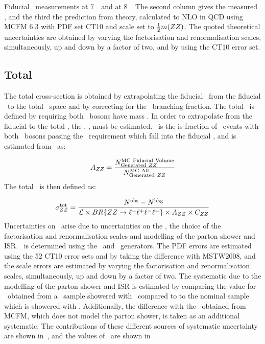 \begin{table}
      \caption[Fiducial \CX\ measurements at 7~\tev\ and at 8~\tev.]
      { Fiducial \CX\ measurements at 7~\tev\ and at 8~\tev. The second column
      gives the measured \cx, and the third the prediction from theory,
      calculated to NLO in QCD using MCFM 6.3 with PDF set CT10 and scale set to
      $\frac{1}{2}m(ZZ)$. The quoted theoretical uncertainties are obtained by
      varying the factorisation and renormalisation scales, simultaneously, up
      and down by a
      factor of two, and by using the CT10 error set.} 
    \label{table:meas-fid-cx}
\renewcommand\arraystretch{1}
\end{table}


\subsection{Total \CX}

The total cross-section is obtained by extrapolating the fiducial \cx\ from the
fiducial \phasespace\ to the total \phasespace\ space and by correcting for the
\ZZllll\ branching fraction. The total \cx\ is defined by requiring both \Z\
bosons have mass \sstooosZ. In order to extrapolate from the fiducial to the
total \phasespace, the \intro{fiducial acceptance factor}, \AZZ, must be
estimated. \AZZ\ is the is fraction of \ZZ\ events with both \Z\ bosons passing
the \sstooosZ\ requirement which fall into the fiducial \phasespace, and is
estimated from \mcsim\ as:

\begin{equation}
\AZZ = \frac{ N^{\rm MC\ Fiducial\ Volume}_{{\rm Generated}\ ZZ} }{ N^{{\rm MC\
All}}_{{\rm Generated}\ ZZ} }
\end{equation}
The total \cx\ is then defined as:

\begin{equation}\label{eq:xsectot_fourl}
\sigma_{ZZ}^{\rm tot} = \frac{ N^{\rm obs} - N^{\rm bkg}}{\mathcal{L} \times
BR\{{ZZ\rightarrow\ell^{-}\ell^{+}\ell^{-}\ell^{+}}\} \times A_{ZZ} \times C_{ZZ}}
\end{equation}
Uncertainties on \AZZ\ arise due to uncertainties on the \partDF, the choice of
the factorisation and renormalisation scales and modelling of the parton shower
and ISR. \AZZ\ is determined using the \powhegbox\ and \ggtwoZZ\ generators. The
PDF errors are estimated using the 52 CT10 error sets and by taking the
difference with MSTW2008, and the scale errors are estimated by varying the
factorisation and renormalisation scales, simultaneously, 
up and down by a factor of two. The systematic due to the modelling of the parton shower
and ISR is estimated by comparing the value for \AZZ\ obtained from a
\powhegbox\ sample showered with \herwig\ compared to to the nominal sample
which is showered with \pythia. Additionally, the difference with the \AZZ\
obtained from MCFM, which does not model the parton shower, is taken as an
additional systematic. The contributions of these different sources of
systematic uncertainty are shown in~\tab{azz-syst}, and the values of \AZZ\ are
shown in~\tab{azz}.

